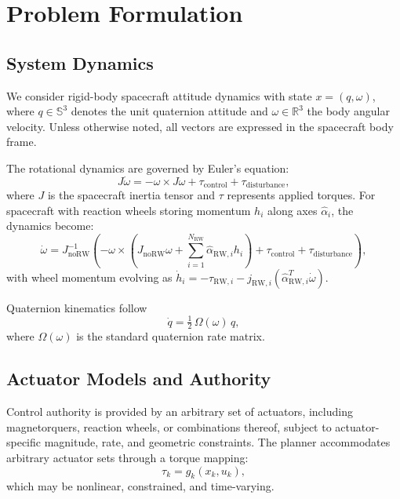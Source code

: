 \documentclass[conference]{IEEEtran}
\begin{document}
\section{Problem Formulation}\label{sec:problem}

\subsection{System Dynamics}\label{subsec:dynamics}

We consider rigid-body spacecraft attitude dynamics with state $x = (q, \omega)$, where $q \in \mathbb{S}^3$ denotes the unit quaternion attitude and $\omega \in \mathbb{R}^3$ the body angular velocity. Unless otherwise noted, all vectors are expressed in the spacecraft body frame.

The rotational dynamics are governed by Euler's equation:
\begin{equation}\label{eq:euler}
    J\dot{\omega} = -\omega \times J\omega + \tau_{\text{control}} + \tau_{\text{disturbance}},
\end{equation}
where $J$ is the spacecraft inertia tensor and $\tau$ represents applied torques. For spacecraft with reaction wheels storing momentum $h_i$ along axes $\hat{\alpha}_i$, the dynamics become:
\begin{equation}
    \label{eq:av_dynamics_reduced}
    \dot{\omega} = J_{\text{noRW}}^{-1}\left(-\omega\times \left(J_{\text{noRW}}\omega +\sum_{i=1}^{N_{\text{RW}}}\hat{\alpha}_{\text{RW},i}h_{i}\right)+\tau_{\text{control}} + \tau_{\text{disturbance}} \right),
\end{equation}
with wheel momentum evolving as $\dot{h}_i = -\tau_{\text{RW},i} - j_{\text{RW},i}(\hat{\alpha}_{\text{RW},i}^T\dot{\omega})$.

Quaternion kinematics follow
\begin{equation}\label{eq:quat_kinematics}
    \dot{q} = \tfrac{1}{2}\,\Omega(\omega)\,q,
\end{equation}
where $\Omega(\omega)$ is the standard quaternion rate matrix.

\subsection{Actuator Models and Authority}\label{subsec:actuators}

Control authority is provided by an arbitrary set of actuators, including magnetorquers, reaction wheels, or combinations thereof, subject to actuator-specific magnitude, rate, and geometric constraints. The planner accommodates arbitrary actuator sets through a torque mapping:
\begin{equation}\label{eq:torque_mapping}
    \tau_k = g_k(x_k, u_k),
\end{equation}
which may be nonlinear, constrained, and time-varying.
\end{document}
